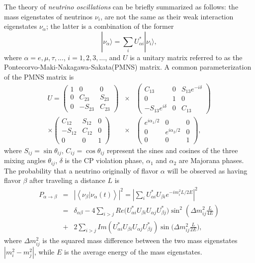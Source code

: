 The theory of \emph{neutrino oscillations} can be briefly summarized as follows: the mass eigenstates of neutrinos $\nu_{i}$, are not the same as their weak interaction eigenstates $\nu_{\alpha}$; the latter is a combination of the former
\begin{equation}
  \label{eq:osci}
  |\nu_{\alpha}\rangle=\sum_{i}U^{*}_{\alpha i}|\nu_{i}\rangle,
\end{equation}
where $\alpha=e,\mu,\tau, ...$, $i=1,2,3, ...$, and $U$ is a unitary matrix referred to as the Pontecorvo-Maki-Nakagawa-Sakata(PMNS) matrix. A common parameterization of the PMNS matrix is
\begin{eqnarray*}
  \label{eq:pmns}
  U = \left(\begin{array}{ccc}
      1 & 0 & 0 \\ 0 & C_{23} & S_{23} \\ 0 & -S_{23} & C_{23}
    \end{array}\right) &\times&
  \left(\begin{array}{ccc}
      C_{13} & 0 & S_{13}e^{-i\delta} \\ 
      0 & 1 & 0 \\ -S_{13}e^{i\delta} & 0 & C_{13}
    \end{array}\right) \\\times
  \left(\begin{array}{ccc}
       C_{12} & S_{12} & 0 \\ -S_{12} & C_{12} & 0 \\ 0 & 0 & 1
    \end{array}\right) &\times&
  \left(\begin{array}{ccc}
      e^{i\alpha_1/2} & 0 & 0 \\ 0 & e^{i\alpha_2/2} & 0 \\ 0 & 0 & 1
    \end{array}\right),
\end{eqnarray*}
where $S_{ij} = \sin\theta_{ij}$, $C_{ij} = \cos\theta_{ij}$ represent the sines and cosines of the three mixing angles $\theta_{ij}$, $\delta$ is the CP violation phase, $\alpha_1$ and $\alpha_2$ are Majorana phases. The probability that a neutrino originally of flavor $\alpha$ will be observed as having flavor $\beta$ after traveling a distance $L$ is
\begin{equation}
  \label{eq:pa2b}
  \begin{matrix}
    P_{\alpha \rightarrow \beta} &=& \left| \left\langle         \nu_{\beta}|\nu_{\alpha}(t) \right\rangle \right|^{2} = \left|       \sum_{i}U_{\alpha i}^{*}U_{\beta i}e^{-i m_{i}^2 L/2E} \right|^{2}\\ &=& \delta_{\alpha\beta} - 4{\displaystyle \sum_{i>j}Re(U_{\alpha         i}^{*}U_{\beta i}U_{\alpha j}U_{\beta j}^{*}})\sin^{2}(\Delta     m_{ij}^{2} \frac{L}{4E})\\ &+& {\displaystyle 2\sum_{i>j}Im(U_{\alpha i}^{*}U_{\beta i}U_{\alpha j}U_{\beta j}^{*})\sin(}\Delta m_{ij}^{2}\frac{L}{2E}),
  \end{matrix}
\end{equation}
where $\Delta m^{2}_{ij}$ is the squared mass difference between the
two mass eigenstates $|m^{2}_{i} - m^{2}_{j}|$, while $E$ is the
average energy of the mass eigenstates.

